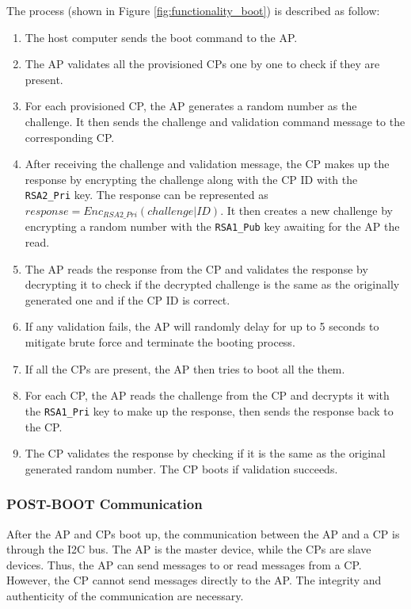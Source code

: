 \documentclass[11pt,oneside,onecolumn,letterpaper]{article}
\begin{document}
	The process (shown in Figure \ref{fig:functionality_boot}) is described as follow:
	\begin{enumerate}
		\item The host computer sends the boot command to the AP.
		\item The AP validates all the provisioned CPs one by one to check if they are present.
		\item For each provisioned CP,
		the AP generates a random number as the challenge.
		It then sends the challenge and validation command message to the corresponding CP.
		\item After receiving the challenge and validation message,
		the CP makes up the response by encrypting the challenge along with the CP ID with the \texttt{RSA2\_Pri} key.
		The response can be represented as $ response = Enc_{RSA2\_Pri} (challenge | ID) $.
		It then creates a new challenge by encrypting a random number with the \texttt{RSA1\_Pub} key awaiting for the AP the read.
		\item The AP reads the response from the CP and validates the response by decrypting it to check if the decrypted challenge is the same as the originally generated one and if the CP ID is correct.
		\item If any validation fails,
		the AP will randomly delay for up to 5 seconds to mitigate brute force and terminate the booting process.
		\item If all the CPs are present,
		the AP then tries to boot all the them.
		\item For each CP,
		the AP reads the challenge from the CP and decrypts it with the \texttt{RSA1\_Pri} key to make up the response,
		then sends the response back to the CP.
		\item The CP validates the response by checking if it is the same as the original generated random number.
		The CP boots if validation succeeds.
	\end{enumerate}
	
	\subsubsection{POST-BOOT Communication}
	After the AP and CPs boot up,
	the communication between the AP and a CP is through the I2C bus.
	The AP is the master device,
	while the CPs are slave devices.
	Thus,
	the AP can send messages to or read messages from a CP.
	However, the CP cannot send messages directly to the AP.
	The integrity and authenticity of the communication are necessary.
	
\end{document}
